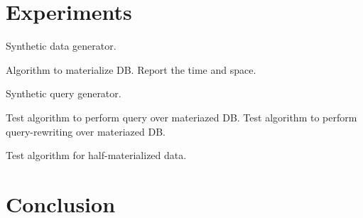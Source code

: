 \documentclass[conference]{IEEEtran}
\begin{document}
\section{Experiments}

Synthetic data generator. 

Algorithm to materialize DB. 
Report the time and space. 

Synthetic query generator. 

Test algorithm to perform query over materiazed DB.
Test algorithm to perform query-rewriting over materiazed DB.

Test algorithm for half-materialized data.

\section{Conclusion}




\end{document}
